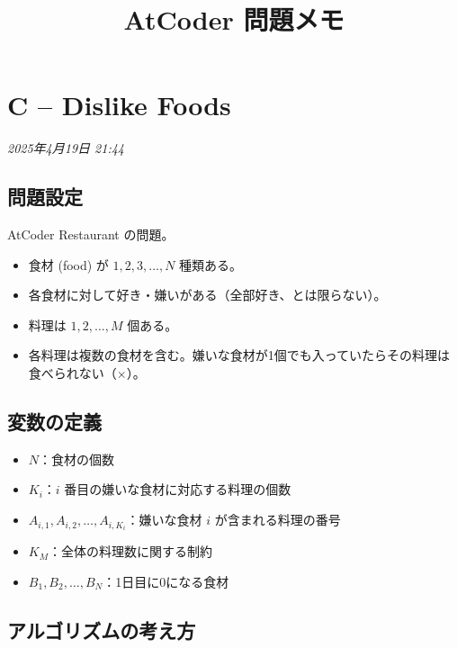 \documentclass[a4paper,11pt]{ltjsarticle}
\title{AtCoder 問題メモ}
\author{}
\date{}
\begin{document}
\maketitle
\tableofcontents
\newpage

\section{C -- Dislike Foods}
\begin{flushright}
\textit{2025年4月19日 21:44}
\end{flushright}

\subsection{問題設定}

AtCoder Restaurant の問題。

\begin{itemize}
  \item 食材 (food) が $1, 2, 3, \ldots, N$ 種類ある。
  \item 各食材に対して好き・嫌いがある（全部好き、とは限らない）。
  \item 料理は $1, 2, \ldots, M$ 個ある。
  \item 各料理は複数の食材を含む。嫌いな食材が1個でも入っていたらその料理は食べられない（$\times$）。
\end{itemize}

\subsection{変数の定義}

\begin{itemize}
  \item $N$：食材の個数
  \item $K_i$：$i$ 番目の嫌いな食材に対応する料理の個数
  \item $A_{i,1}, A_{i,2}, \ldots, A_{i,K_i}$：嫌いな食材 $i$ が含まれる料理の番号
  \item $K_M$：全体の料理数に関する制約
  \item $B_1, B_2, \ldots, B_N$：1日目に0になる食材
\end{itemize}

\subsection{アルゴリズムの考え方}
\end{document}
